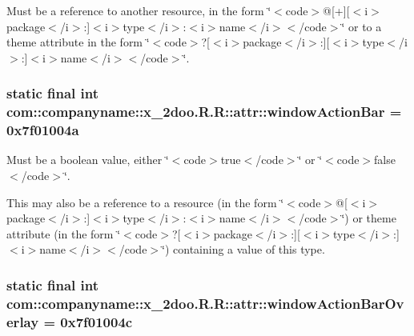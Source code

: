 Must be a reference to another resource, in the form \char`\"{}$<$code$>$@\mbox{[}+\mbox{]}\mbox{[}$<$i$>$package$<$/i$>$:\mbox{]}$<$i$>$type$<$/i$>$:$<$i$>$name$<$/i$>$$<$/code$>$\char`\"{} or to a theme attribute in the form \char`\"{}$<$code$>$?\mbox{[}$<$i$>$package$<$/i$>$:\mbox{]}\mbox{[}$<$i$>$type$<$/i$>$:\mbox{]}$<$i$>$name$<$/i$>$$<$/code$>$\char`\"{}. \hypertarget{classcom_1_1companyname_1_1x__2doo_1_1_r_1_1attr_30166d5608d3fa87b3f864f4f5048c55}{
\subsubsection[{windowActionBar}]{\setlength{\rightskip}{0pt plus 5cm}static final int com::companyname::x\_\-2doo.R.R::attr::windowActionBar = 0x7f01004a}}
\label{classcom_1_1companyname_1_1x__2doo_1_1_r_1_1attr_30166d5608d3fa87b3f864f4f5048c55}


Must be a boolean value, either \char`\"{}$<$code$>$true$<$/code$>$\char`\"{} or \char`\"{}$<$code$>$false$<$/code$>$\char`\"{}. 

This may also be a reference to a resource (in the form \char`\"{}$<$code$>$@\mbox{[}$<$i$>$package$<$/i$>$:\mbox{]}$<$i$>$type$<$/i$>$:$<$i$>$name$<$/i$>$$<$/code$>$\char`\"{}) or theme attribute (in the form \char`\"{}$<$code$>$?\mbox{[}$<$i$>$package$<$/i$>$:\mbox{]}\mbox{[}$<$i$>$type$<$/i$>$:\mbox{]}$<$i$>$name$<$/i$>$$<$/code$>$\char`\"{}) containing a value of this type. \hypertarget{classcom_1_1companyname_1_1x__2doo_1_1_r_1_1attr_863e485ff797ded1a8ec6b847ee30779}{
\subsubsection[{windowActionBarOverlay}]{\setlength{\rightskip}{0pt plus 5cm}static final int com::companyname::x\_\-2doo.R.R::attr::windowActionBarOverlay = 0x7f01004c}}
\label{classcom_1_1companyname_1_1x__2doo_1_1_r_1_1attr_863e485ff797ded1a8ec6b847ee30779}


